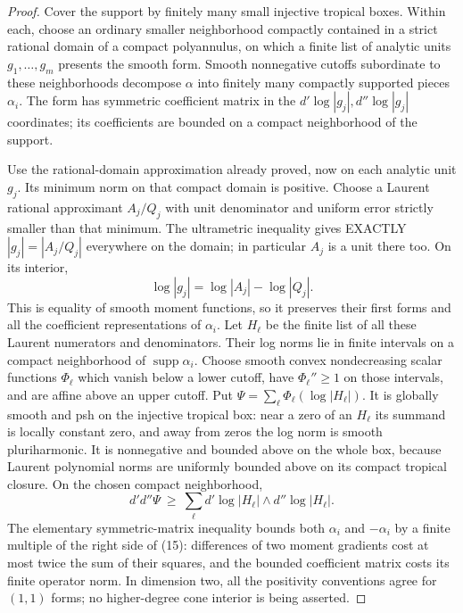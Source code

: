 \documentclass[11pt]{article}
\begin{document}
\begin{proof}
Cover the support by finitely many small injective tropical boxes. Within each,
choose an ordinary smaller neighborhood compactly contained in a strict
rational domain of a compact polyannulus, on which a finite list of analytic
units $g_1,\ldots,g_m$ presents the smooth form.
Smooth nonnegative cutoffs subordinate to these neighborhoods decompose
$\alpha$ into finitely many compactly supported pieces $\alpha_i$.
The form has symmetric coefficient matrix in the $d'\log|g_j|,
 d''\log|g_j|$ coordinates; its coefficients are bounded on a compact
neighborhood of the support.

Use the rational-domain approximation already proved, now on each analytic
unit $g_j$. Its minimum norm on that compact domain is positive.
Choose a Laurent rational approximant $A_j/Q_j$ with unit denominator and
uniform error strictly smaller than that minimum. The ultrametric inequality
gives EXACTLY $|g_j|=|A_j/Q_j|$ everywhere on the domain; in particular
$A_j$ is a unit there too. On its interior,
\[
 \log|g_j|=\log|A_j|-\log|Q_j|.
\]
This is equality of smooth moment functions, so it preserves their first
forms and all the coefficient representations of $\alpha_i$.
Let $H_\ell$ be the finite list of all these Laurent numerators and denominators.
Their log norms lie in finite intervals on a compact neighborhood of
$\operatorname{supp}\alpha_i$.
Choose smooth convex nondecreasing scalar functions $\Phi_\ell$ which vanish
below a lower cutoff, have $\Phi_\ell''\ge1$ on those intervals, and are
affine above an upper cutoff. Put
$\Psi=\sum_\ell\Phi_\ell(\log|H_\ell|)$.
It is globally smooth and psh on the injective tropical box: near a zero of
an $H_\ell$ its summand is locally constant zero, and away from zeros the
log norm is smooth pluriharmonic. It is nonnegative and bounded above on
the whole box, because Laurent polynomial norms are uniformly bounded above
on its compact tropical closure. On the chosen compact neighborhood,
\[
 d'd''\Psi\ \ge\ \sum_\ell
 d'\log|H_\ell|\wedge d''\log|H_\ell|.                     \tag{15}
\]
The elementary symmetric-matrix inequality bounds both $\alpha_i$ and
$-\alpha_i$ by a finite multiple of the right side of (15): differences of
two moment gradients cost at most twice the sum of their squares, and the
bounded coefficient matrix costs its finite operator norm. In dimension two,
all the positivity conventions agree for $(1,1)$ forms; no higher-degree
cone interior is being asserted.


\end{proof}
\end{document}
